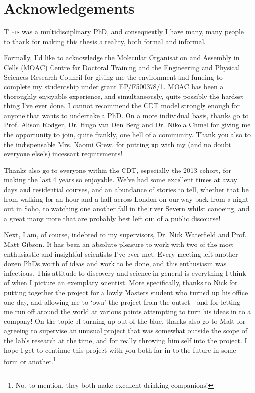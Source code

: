 \pagestyle{plain}
\chapter*{Acknowledgements}

\lettrine[lraise=0.0, nindent=0.1em, slope=1em]{T}{ his} was a multidisciplinary PhD, and consequently I have many, many people to thank for making this thesis a reality, both formal and informal.

Formally, I'd like to acknowledge the Molecular Organisation and Assembly in Cells (MOAC) Centre for Doctoral Training and the Engineering and Physical Sciences Research Council for giving me the environment and funding to complete my studentship under grant EP/F500378/1. MOAC has been a thoroughly enjoyable experience, and simultaneously, quite possibly the hardest thing I've ever done. I cannot recommend the CDT model strongly enough for anyone that wants to undertake a PhD. On a more individual basis, thanks go to Prof. Alison Rodger, Dr. Hugo van Den Berg and Dr. Nikola Chmel for giving me the opportunity to join, quite frankly, one hell of a community. Thank you also to the indispensable Mrs. Naomi Grew, for putting up with my (and no doubt everyone else's) incessant requirements!

Thanks also go to everyone within the CDT, especially the 2013 cohort, for making the last 4 years so enjoyable. We've had some excellent times at away days and residential courses, and an abundance of stories to tell, whether that be from walking for an hour and a half across London on our way back from a night out in Soho, to watching one another fall in the river Severn whilst canoeing, and a great many more that are probably best left out of a public discourse!

Next, I am, of course, indebted to my supervisors, Dr. Nick Waterfield and Prof. Matt Gibson. It has been an absolute pleasure to work with two of the most enthusiastic and insightful scientists I've ever met. Every meeting left another dozen PhDs worth of ideas and work to be done, and this enthusiasm was infectious. This attitude to discovery and science in general is everything I think of when I picture an exemplary scientist. More specifically, thanks to Nick for putting together the project for a lowly Masters student who turned up his office one day, and allowing me to `own' the project from the outset - and for letting me run off around the world at various points attempting to turn his ideas in to a company! On the topic of turning up out of the blue, thanks also go to Matt for agreeing to supervise an unusual project that was somewhat outside the scope of the lab's research at the time, and for really throwing him self into the project. I hope I get to continue this project with you both far in to the future in some form or another.\footnote{Not to mention, they both make excellent drinking companions!}

